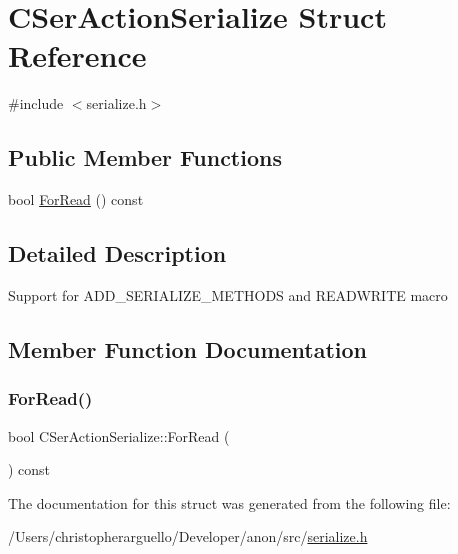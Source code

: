 \hypertarget{struct_c_ser_action_serialize}{}\section{C\+Ser\+Action\+Serialize Struct Reference}
\label{struct_c_ser_action_serialize}


{\ttfamily \#include $<$serialize.\+h$>$}

\subsection*{Public Member Functions}
\begin{DoxyCompactItemize}
\item 
bool \mbox{\hyperlink{struct_c_ser_action_serialize_a3facaa35d0ba0b175c647b5409d2bde8}{For\+Read}} () const
\end{DoxyCompactItemize}


\subsection{Detailed Description}
Support for A\+D\+D\+\_\+\+S\+E\+R\+I\+A\+L\+I\+Z\+E\+\_\+\+M\+E\+T\+H\+O\+DS and R\+E\+A\+D\+W\+R\+I\+TE macro 

\subsection{Member Function Documentation}
\mbox{\label{struct_c_ser_action_serialize_a3facaa35d0ba0b175c647b5409d2bde8}} 
\subsubsection{\texorpdfstring{For\+Read()}{ForRead()}}
{\footnotesize\ttfamily bool C\+Ser\+Action\+Serialize\+::\+For\+Read (\begin{DoxyParamCaption}{ }\end{DoxyParamCaption}) const\hspace{0.3cm}{\ttfamily [inline]}}



The documentation for this struct was generated from the following file\+:\begin{DoxyCompactItemize}
\item 
/\+Users/christopherarguello/\+Developer/anon/src/\mbox{\hyperlink{serialize_8h}{serialize.\+h}}\end{DoxyCompactItemize}
